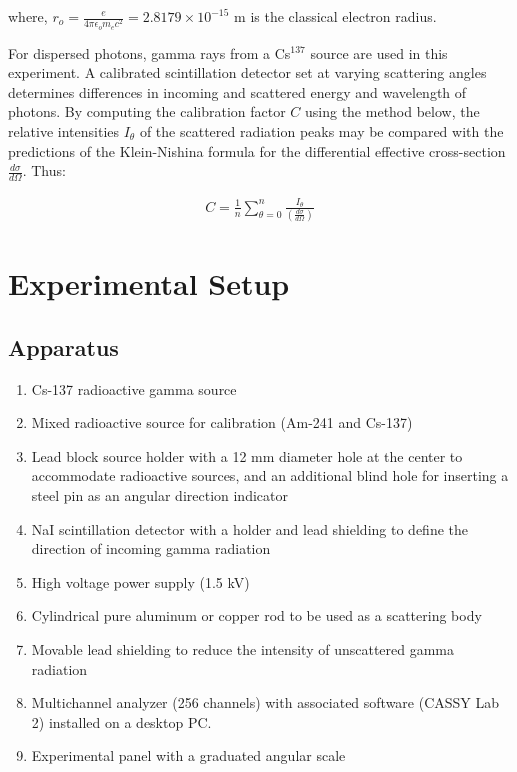 where, $r_o=\frac{e}{4\pi\epsilon_om_ec^2} = 2.8179 \times 10^{-15}$ m is the classical electron radius.

For dispersed photons, gamma rays from a Cs$^{137}$ source are used in this experiment. A calibrated scintillation detector set at varying scattering angles determines differences in incoming and scattered energy and wavelength of photons. By computing the calibration factor $C$ using the method below, the relative intensities $I_\theta$ of the scattered radiation peaks may be compared with the predictions of the Klein-Nishina formula for the differential effective cross-section $\frac{d\sigma}{d\Omega}$. Thus:

\begin{align} C=\frac{1}{n}\sum_{\theta=0}^{n}\frac{I_\theta}{\left(\frac{d\sigma}{d\Omega}\right)}\end{align}

	
\section{Experimental Setup}

\subsection*{Apparatus}

\begin{enumerate}
    \item Cs-137 radioactive gamma source
    \item Mixed radioactive source for calibration (Am-241 and Cs-137)
    \item Lead block source holder with a 12 mm diameter hole at the center to accommodate radioactive sources, and an additional blind hole for inserting a steel pin as an angular direction indicator
    \item NaI scintillation detector with a holder and lead shielding to define the direction of incoming gamma radiation
    \item High voltage power supply (1.5 kV)
    \item Cylindrical pure aluminum or copper rod to be used as a scattering body
    \item Movable lead shielding to reduce the intensity of unscattered gamma radiation
    \item Multichannel analyzer (256 channels) with associated software (CASSY Lab 2) installed on a desktop PC.
    \item Experimental panel with a graduated angular scale\\
\end{enumerate}

